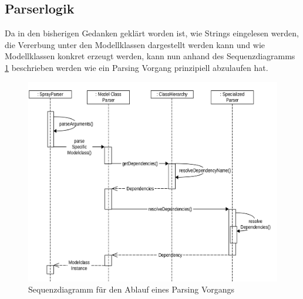 \subsection{Parserlogik}
Da in den bisherigen Gedanken geklärt worden ist, wie Strings eingelesen werden, die Vererbung unter den Modellklassen dargestellt werden kann und wie Modellklassen konkret erzeugt werden, kann nun anhand des Sequenzdiagramms \ref{sequenzdiagrammAnsatz} beschrieben werden wie ein Parsing Vorgang prinzipiell abzulaufen hat.\linebreak
\begin{figure}[htb]
	\hspace*{-0.5cm}
		\includegraphics[scale = 0.13]{Bilder/sequenzdiagrammAnsatzKomprimiertScaled(2500x2500).png}
		\caption{Sequenzdiagramm für den Ablauf eines Parsing Vorgangs}
		\label{sequenzdiagrammAnsatz}

\end{figure}

